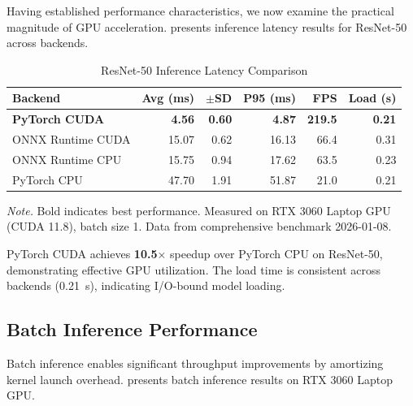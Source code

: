 \documentclass[10pt,twocolumn,a4paper]{article}
\theoremstyle{definition}
\theoremstyle{plain}
\newcommand{\timesX}[1]{#1$\times$}
\begin{document}
Having established performance characteristics, we now examine the practical magnitude of GPU acceleration.  presents inference latency results for ResNet-50 across backends.

\begin{table}[t]
\centering
\caption{ResNet-50 Inference Latency Comparison}
\label{tab:latency}
\scriptsize
\setlength{\tabcolsep}{3pt}
\begin{tabular}{@{}lrrrrr@{}}
\toprule
\textbf{Backend} & \textbf{Avg (ms)} & \textbf{$\pm$SD} & \textbf{P95 (ms)} & \textbf{FPS} & \textbf{Load (s)} \\
\midrule
\textbf{PyTorch CUDA} & \textbf{4.56} & \textbf{0.60} & \textbf{4.87} & \textbf{219.5} & \textbf{0.21} \\
ONNX Runtime CUDA & 15.07 & 0.62 & 16.13 & 66.4 & 0.31 \\
ONNX Runtime CPU & 15.75 & 0.94 & 17.62 & 63.5 & 0.23 \\
PyTorch CPU & 47.70 & 1.91 & 51.87 & 21.0 & 0.21 \\
\bottomrule
\end{tabular}

\vspace{0.5em}
\noindent\textit{Note.} Bold indicates best performance. Measured on RTX 3060 Laptop GPU (CUDA 11.8), batch size 1. Data from comprehensive benchmark 2026-01-08.
\end{table}

PyTorch CUDA achieves \textbf{\timesX{10.5}} speedup over PyTorch CPU on ResNet-50, demonstrating effective GPU utilization. The load time is consistent across backends (\SI{0.21}{\second}), indicating I/O-bound model loading.

\subsection{Batch Inference Performance}

Batch inference enables significant throughput improvements by amortizing kernel launch overhead.  presents batch inference results on RTX 3060 Laptop GPU.
\end{document}
